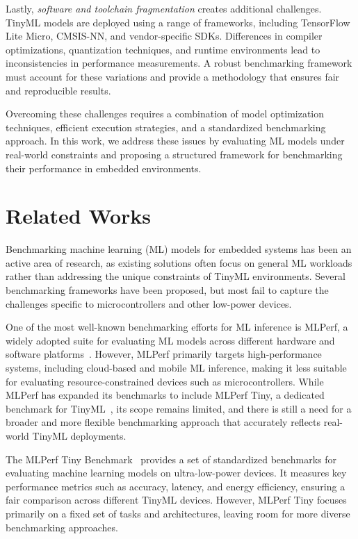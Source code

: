 \documentclass[conference]{IEEEtran}
\begin{document}
Lastly, \textit{software and toolchain fragmentation} creates additional challenges. TinyML models are deployed using a range of frameworks, including TensorFlow Lite Micro, CMSIS-NN, and vendor-specific SDKs. Differences in compiler optimizations, quantization techniques, and runtime environments lead to inconsistencies in performance measurements. A robust benchmarking framework must account for these variations and provide a methodology that ensures fair and reproducible results.

Overcoming these challenges requires a combination of model optimization techniques, efficient execution strategies, and a standardized benchmarking approach. In this work, we address these issues by evaluating ML models under real-world constraints and proposing a structured framework for benchmarking their performance in embedded environments.

\section{Related Works}

Benchmarking machine learning (ML) models for embedded systems has been an active area of research, as existing solutions often focus on general ML workloads rather than addressing the unique constraints of TinyML environments. Several benchmarking frameworks have been proposed, but most fail to capture the challenges specific to microcontrollers and other low-power devices.

One of the most well-known benchmarking efforts for ML inference is {MLPerf}, a widely adopted suite for evaluating ML models across different hardware and software platforms~\cite{reddi2019mlperf}. However, MLPerf primarily targets high-performance systems, including cloud-based and mobile ML inference, making it less suitable for evaluating resource-constrained devices such as microcontrollers. While MLPerf has expanded its benchmarks to include {MLPerf Tiny}, a dedicated benchmark for TinyML~\cite{banbury2021mlperf}, its scope remains limited, and there is still a need for a broader and more flexible benchmarking approach that accurately reflects real-world TinyML deployments.

The {MLPerf Tiny Benchmark}~\cite{banbury2021mlperfTiny} provides a set of standardized benchmarks for evaluating machine learning models on ultra-low-power devices. It measures key performance metrics such as accuracy, latency, and energy efficiency, ensuring a fair comparison across different TinyML devices. However, MLPerf Tiny focuses primarily on a fixed set of tasks and architectures, leaving room for more diverse benchmarking approaches.
\end{document}
